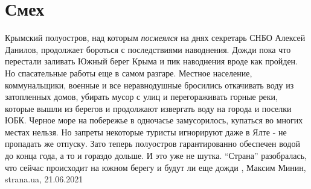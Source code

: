  
 
 
 
 
\chapter{Смех}
\label{sec:slova.smeh}

Крымский полуостров, над которым \emph{посмеялся} на днях секретарь СНБО
Алексей Данилов, продолжает бороться с последствиями наводнения.  Дожди пока
что перестали заливать Южный берег Крыма и пик наводнения вроде как пройден. Но
спасательные работы еще в самом разгаре.  Местное население, коммунальщики,
военные и все неравнодушные бросились откачивать воду из затопленных домов,
убирать мусор с улиц и перегораживать горные реки, которые вышли из берегов и
продолжают извергать воду на города и поселки ЮБК.  Черное море на побережье в
одночасье замусорилось, купаться во многих местах нельзя. Но запреты некоторые
туристы игнорируют даже в Ялте - не пропадать же отпуску.  Зато теперь
полуостров гарантированно обеспечен водой до конца года, а то и гораздо дольше.
И это уже не шутка.  \enquote{Страна} разобралась, что сейчас происходит на
южном берегу и будут ли еще дожди
, 
Максим Минин, strana.ua, 21.06.2021


